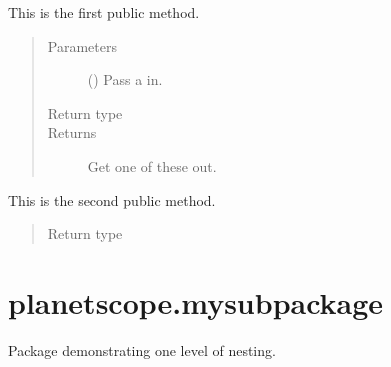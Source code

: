 \documentclass[letterpaper,10pt,english]{sphinxmanual}
\begin{document}
\begin{fulllineitems}
\begin{fulllineitems}
\label{\detokenize{_autosummary/planetscope.mymodule3a.myClass2:planetscope.mymodule3a.myClass2.myMethod1}}
\sphinxAtStartPar
This is the first public method.
\begin{quote}\begin{description}
\item[{Parameters}] \leavevmode
\sphinxAtStartPar
{} () \textendash{} Pass a  in.

\item[{Return type}] \leavevmode
\sphinxAtStartPar
{}

\item[{Returns}] \leavevmode
\sphinxAtStartPar
Get one of these out.

\end{description}\end{quote}

\end{fulllineitems}


\begin{fulllineitems}
\label{\detokenize{_autosummary/planetscope.mymodule3a.myClass2:planetscope.mymodule3a.myClass2.myMethod2}}
\sphinxAtStartPar
This is the second public method.
\begin{quote}\begin{description}
\item[{Return type}] \leavevmode
\sphinxAtStartPar
{}

\end{description}\end{quote}

\end{fulllineitems}


\end{fulllineitems}



\section{planetscope.mysubpackage}
\label{\detokenize{_autosummary/planetscope.mysubpackage:module-planetscope.mysubpackage}}\label{\detokenize{_autosummary/planetscope.mysubpackage:planetscope-mysubpackage}}\label{\detokenize{_autosummary/planetscope.mysubpackage::doc}}
\sphinxAtStartPar
Package demonstrating one level of nesting.
\end{document}
